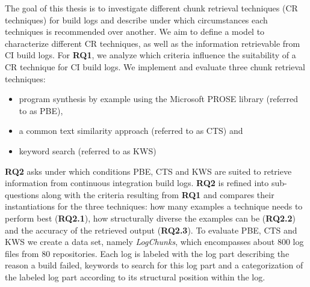 \documentclass[\myrootdir/main.tex]{subfiles}
\begin{document}
The goal of this thesis is to investigate different chunk retrieval techniques (CR techniques) for build logs and describe under which circumstances each techniques is recommended over another.
We aim to define a model to characterize different CR techniques, as well as the information retrievable from CI build logs.
For \textbf{RQ1}, we analyze which criteria influence the suitability of a CR technique for CI build logs.
We implement and evaluate three chunk retrieval techniques:
\begin{itemize}
  \item program synthesis by example using the Microsoft PROSE library (referred to as PBE),
  \item a common text similarity approach (referred to as CTS) and
  \item keyword search (referred to as KWS)
\end{itemize}
\textbf{RQ2} asks under which conditions PBE, CTS and KWS are suited to retrieve information from continuous integration build logs.
\textbf{RQ2} is refined into sub-questions along with the criteria resulting from \textbf{RQ1} and compares their instantiations for the three techniques:
how many examples a technique needs to perform best (\textbf{RQ2.1}), how structurally diverse the examples can be (\textbf{RQ2.2}) and the accuracy of the retrieved output (\textbf{RQ2.3}).
To evaluate PBE, CTS and KWS we create a data set, namely \emph{LogChunks}, which encompasses about 800 log files from 80 repositories.
Each log is labeled with the log part describing the reason a build failed, keywords to search for this log part and a categorization of the labeled log part according to its structural position within the log.
\end{document}
